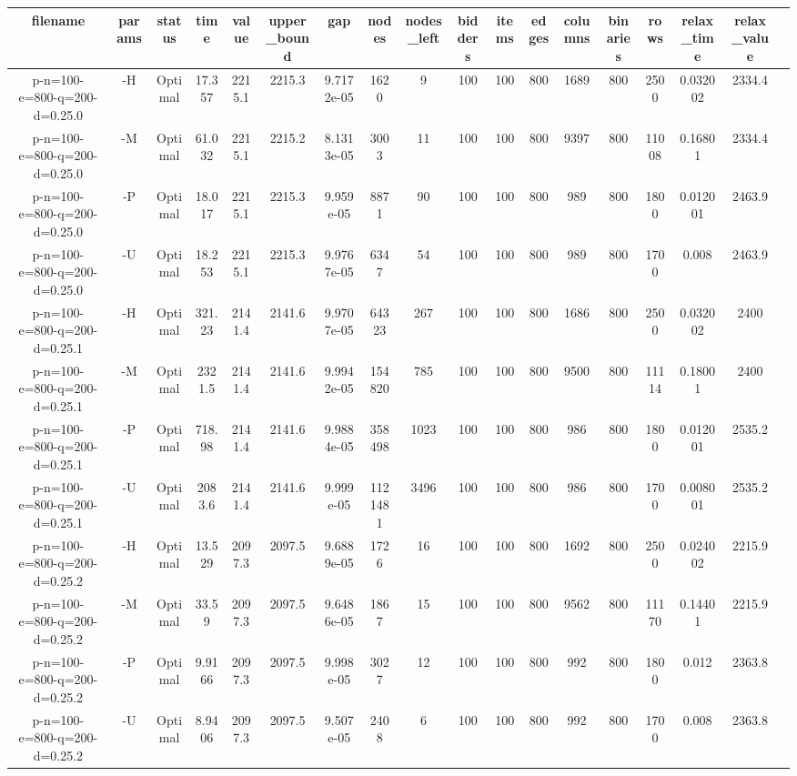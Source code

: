\documentclass[landscape, a4paper]{article}
\begin{document}
\tiny

\begin{center}
\begin{tabular}{@{}cccccccccccccccccc@{}}
filename & params & status & time & value & upper\_bound & gap & nodes & nodes\_left & bidders & items & edges & columns & binaries & rows & relax\_time & relax\_value & \\
\hline
p-n=100-e=800-q=200-d=0.25.0 & -H & Optimal & 17.357 & 2215.1 & 2215.3 & 9.7172e-05 & 1620 & 9 & 100 & 100 & 800 & 1689 & 800 & 2500 & 0.032002 & 2334.4 & \\
p-n=100-e=800-q=200-d=0.25.0 & -M & Optimal & 61.032 & 2215.1 & 2215.2 & 8.1313e-05 & 3003 & 11 & 100 & 100 & 800 & 9397 & 800 & 11008 & 0.16801 & 2334.4 & \\
p-n=100-e=800-q=200-d=0.25.0 & -P & Optimal & 18.017 & 2215.1 & 2215.3 & 9.959e-05 & 8871 & 90 & 100 & 100 & 800 & 989 & 800 & 1800 & 0.012001 & 2463.9 & \\
p-n=100-e=800-q=200-d=0.25.0 & -U & Optimal & 18.253 & 2215.1 & 2215.3 & 9.9767e-05 & 6347 & 54 & 100 & 100 & 800 & 989 & 800 & 1700 & 0.008 & 2463.9 & \\
p-n=100-e=800-q=200-d=0.25.1 & -H & Optimal & 321.23 & 2141.4 & 2141.6 & 9.9707e-05 & 64323 & 267 & 100 & 100 & 800 & 1686 & 800 & 2500 & 0.032002 & 2400 & \\
p-n=100-e=800-q=200-d=0.25.1 & -M & Optimal & 2321.5 & 2141.4 & 2141.6 & 9.9942e-05 & 154820 & 785 & 100 & 100 & 800 & 9500 & 800 & 11114 & 0.18001 & 2400 & \\
p-n=100-e=800-q=200-d=0.25.1 & -P & Optimal & 718.98 & 2141.4 & 2141.6 & 9.9884e-05 & 358498 & 1023 & 100 & 100 & 800 & 986 & 800 & 1800 & 0.012001 & 2535.2 & \\
p-n=100-e=800-q=200-d=0.25.1 & -U & Optimal & 2083.6 & 2141.4 & 2141.6 & 9.999e-05 & 1121481 & 3496 & 100 & 100 & 800 & 986 & 800 & 1700 & 0.008001 & 2535.2 & \\
p-n=100-e=800-q=200-d=0.25.2 & -H & Optimal & 13.529 & 2097.3 & 2097.5 & 9.6889e-05 & 1726 & 16 & 100 & 100 & 800 & 1692 & 800 & 2500 & 0.024002 & 2215.9 & \\
p-n=100-e=800-q=200-d=0.25.2 & -M & Optimal & 33.59 & 2097.3 & 2097.5 & 9.6486e-05 & 1867 & 15 & 100 & 100 & 800 & 9562 & 800 & 11170 & 0.14401 & 2215.9 & \\
p-n=100-e=800-q=200-d=0.25.2 & -P & Optimal & 9.9166 & 2097.3 & 2097.5 & 9.998e-05 & 3027 & 12 & 100 & 100 & 800 & 992 & 800 & 1800 & 0.012 & 2363.8 & \\
p-n=100-e=800-q=200-d=0.25.2 & -U & Optimal & 8.9406 & 2097.3 & 2097.5 & 9.507e-05 & 2408 & 6 & 100 & 100 & 800 & 992 & 800 & 1700 & 0.008 & 2363.8 & \\

\end{tabular}
\end{center}
\end{document}
